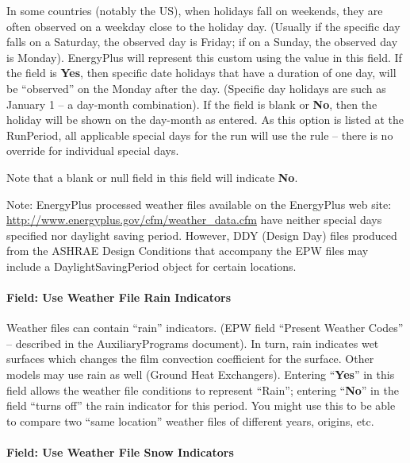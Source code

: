 In some countries (notably the US), when holidays fall on weekends, they are often observed on a weekday close to the holiday day. (Usually if the specific day falls on a Saturday, the observed day is Friday; if on a Sunday, the observed day is Monday). EnergyPlus will represent this custom using the value in this field. If the field is \textbf{Yes}, then specific date holidays that have a duration of one day, will be ``observed'' on the Monday after the day. (Specific day holidays are such as January 1 -- a day-month combination). If the field is blank or \textbf{No}, then the holiday will be shown on the day-month as entered. As this option is listed at the RunPeriod, all applicable special days for the run will use the rule -- there is no override for individual special days.

Note that a blank or null field in this field will indicate \textbf{No}.

\begin{callout}
Note: EnergyPlus processed weather files available on the EnergyPlus web site: \url{http://www.energyplus.gov/cfm/weather\_data.cfm} have neither special days specified nor daylight saving period. However, DDY (Design Day) files produced from the ASHRAE Design Conditions that accompany the EPW files may include a DaylightSavingPeriod object for certain locations.
\end{callout}

\paragraph{Field: Use Weather File Rain Indicators}\label{field-use-weather-file-rain-indicators-1}

Weather files can contain ``rain'' indicators. (EPW field ``Present Weather Codes'' -- described in the AuxiliaryPrograms document). In turn, rain indicates wet surfaces which changes the film convection coefficient for the surface. Other models may use rain as well (Ground Heat Exchangers). Entering ``\textbf{Yes}'' in this field allows the weather file conditions to represent ``Rain''; entering ``\textbf{No}'' in the field ``turns off'' the rain indicator for this period. You might use this to be able to compare two ``same location'' weather files of different years, origins, etc.

\paragraph{Field: Use Weather File Snow Indicators}\label{field-use-weather-file-snow-indicators-1}

